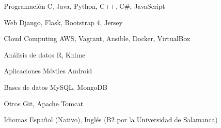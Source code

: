 


\begin{cvskills}


\cvskill
{Programación} %
{C, Java, Python, C++, C\#, JavaScript } %


\cvskill
{Web} %
{Django, Flask, Bootstrap 4, Jersey} %


\cvskill
{Cloud Computing} %
{AWS, Vagrant, Ansible, Docker, VirtualBox} %


\cvskill
{Análisis de datos} %
{R, Knime} %


\cvskill
{Aplicaciones Móviles} %
{Android} %


\cvskill
{Bases de datos} %
{MySQL, MongoDB} %


\cvskill
{Otros} %
{Git, Apache Tomcat} %


\cvskill
{Idiomas} %
{Español (Nativo), Inglés (B2 por la Universidad de Salamanca)} %


\end{cvskills}